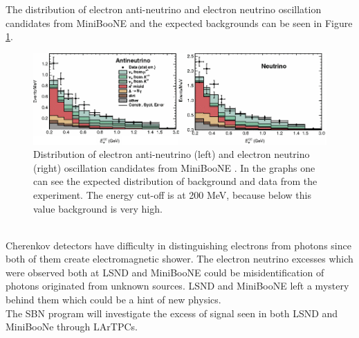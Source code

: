 \documentclass[a4paper]{article}\linespread{1.4}
\begin{document}
The distribution of electron anti-neutrino and electron neutrino oscillation candidates from MiniBooNE and the expected backgrounds can be seen in Figure \ref{fig:ndata}. 
\begin{figure}[h!] \centering \includegraphics[width=124mm,scale=1.0]{ndata.png} \caption{Distribution of electron anti-neutrino (left) and electron neutrino (right) oscillation candidates from MiniBooNE \cite{KP}. In the graphs one can see the expected distribution of background and data from the experiment. The energy cut-off is at 200 MeV, because below this value background is very high.} \label{fig:ndata}\end{figure}  
\\Cherenkov detectors have difficulty in distinguishing electrons from photons since both of them create electromagnetic shower.
The electron neutrino excesses which were observed both at LSND and MiniBooNE could be misidentification of photons originated from unknown sources.
LSND and MiniBooNE left a mystery behind them which could be a hint of new physics. %
\\The SBN program will investigate the excess of signal seen in both LSND and MiniBooNe through LArTPCs.
\end{document}
